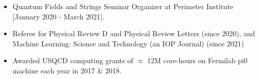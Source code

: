 \renewcommand{\arraystretch}{1.1}

	\begin{itemize}
	\vspace{1mm} 
	 \item Quantum Fields and Strings Seminar Organizer at Perimeter Institute [January 2020 - March 2021].
	  \item Referee for Physical Review D and Physical Review Letters (since 2020), and Machine Learning: Science and Technology (an IOP Journal) (since 2021)
	  \item Awarded USQCD computing grants of $\approx$ 12M core-hours on Fermilab pi0 machine each year in 2017 \& 2018. 
	  \end{itemize}
